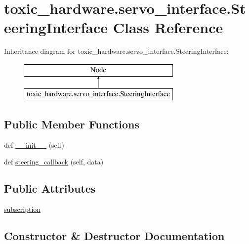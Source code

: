 \hypertarget{classtoxic__hardware_1_1servo__interface_1_1SteeringInterface}{}\section{toxic\+\_\+hardware.\+servo\+\_\+interface.\+Steering\+Interface Class Reference}
\label{classtoxic__hardware_1_1servo__interface_1_1SteeringInterface}
Inheritance diagram for toxic\+\_\+hardware.\+servo\+\_\+interface.\+Steering\+Interface\+:\begin{figure}[H]
\begin{center}
\leavevmode
\includegraphics[height=2.000000cm]{dc/d0c/classtoxic__hardware_1_1servo__interface_1_1SteeringInterface}
\end{center}
\end{figure}
\subsection*{Public Member Functions}
\begin{DoxyCompactItemize}
\item 
def \mbox{\hyperlink{classtoxic__hardware_1_1servo__interface_1_1SteeringInterface_a142bf7e6a8111d917f96666cad3e4f4a}{\+\_\+\+\_\+init\+\_\+\+\_\+}} (self)
\item 
def \mbox{\hyperlink{classtoxic__hardware_1_1servo__interface_1_1SteeringInterface_a9203c78ae211f3b1ba71149144478843}{steering\+\_\+callback}} (self, data)
\end{DoxyCompactItemize}
\subsection*{Public Attributes}
\begin{DoxyCompactItemize}
\item 
\mbox{\hyperlink{classtoxic__hardware_1_1servo__interface_1_1SteeringInterface_a8a2a267ffa6a7fba14bf0fd333071fa4}{subscription}}
\end{DoxyCompactItemize}


\subsection{Constructor \& Destructor Documentation}
\mbox{\label{classtoxic__hardware_1_1servo__interface_1_1SteeringInterface_a142bf7e6a8111d917f96666cad3e4f4a}} 
